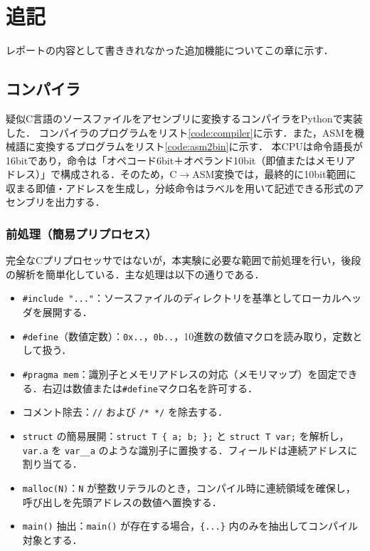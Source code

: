 \documentclass[a4paper,11pt]{ltjsarticle}
\begin{document}
\section{追記}
レポートの内容として書ききれなかった追加機能についてこの章に示す．
\subsection{コンパイラ}
疑似C言語のソースファイルをアセンブリに変換するコンパイラをPythonで実装した．
コンパイラのプログラムをリスト\ref{code:compiler}に示す．また，ASMを機械語に変換するプログラムをリスト\ref{code:asm2bin}に示す．
本CPUは命令語長が16bitであり，命令は「オペコード6bit＋オペランド10bit（即値またはメモリアドレス）」で構成される．そのため，C$\rightarrow$ASM変換では，最終的に10bit範囲に収まる即値・アドレスを生成し，分岐命令はラベルを用いて記述できる形式のアセンブリを出力する．


\subsubsection{前処理（簡易プリプロセス）}
完全なCプリプロセッサではないが，本実験に必要な範囲で前処理を行い，後段の解析を簡単化している．主な処理は以下の通りである．
\begin{itemize}
    \item \texttt{\#include "..."}：ソースファイルのディレクトリを基準としてローカルヘッダを展開する．
    \item \texttt{\#define}（数値定数）：\texttt{0x..}，\texttt{0b..}，10進数の数値マクロを読み取り，定数として扱う．
    \item \texttt{\#pragma mem}：識別子とメモリアドレスの対応（メモリマップ）を固定できる．右辺は数値または\texttt{\#define}マクロ名を許可する．
    \item コメント除去：\texttt{//} および \texttt{/* */} を除去する．
    \item \texttt{struct} の簡易展開：\texttt{struct T \{ a; b; \};} と \texttt{struct T var;} を解析し，\texttt{var.a} を \texttt{var\_\_a} のような識別子に置換する．フィールドは連続アドレスに割り当てる．
    \item \texttt{malloc(N)}：\texttt{N} が整数リテラルのとき，コンパイル時に連続領域を確保し，呼び出しを先頭アドレスの数値へ置換する．
    \item \texttt{main()} 抽出：\texttt{main()} が存在する場合，\texttt{\{...\}} 内のみを抽出してコンパイル対象とする．
\end{itemize}
\end{document}
